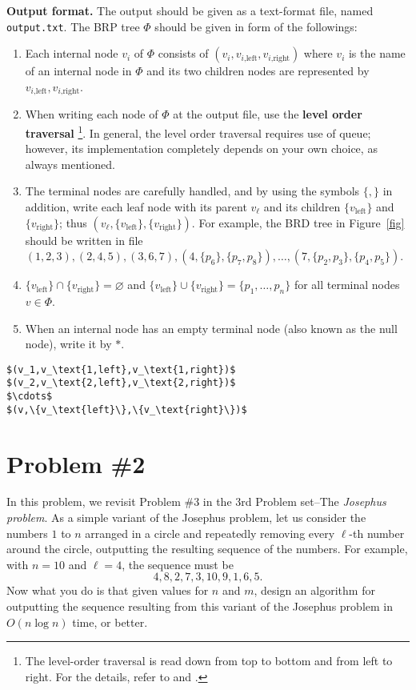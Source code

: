 \documentclass{article}
\begin{document}
\bigskip
\noindent\textbf{Output format.} %
The output should be given as a text-format file, named \texttt{output.txt}.
The BRP tree $\Phi$ should be given in form of the followings:
\begin{enumerate}
\item Each internal node $v_i$ of $\Phi$ consists of $(v_i,v_\text{$i$,left},v_\text{$i$,right})$ where $v_i$ is the name of an internal node in $\Phi$ and
its two children nodes are represented by $v_\text{$i$,left},v_\text{$i$,right}$.
\item When writing each node of $\Phi$ at the output file, use the \textbf{level order traversal}%
\footnote{The level-order traversal is read down from top to bottom and from left to right. 
For the details, refer to \cite[\S5.3.6]{HSAf08} and \cite[\S5.6]{Sed98}.
}. 
In general, the level order traversal requires use of queue;
	however, its implementation completely depends on your own choice, as always mentioned. 
\item The terminal nodes are carefully handled, and by using the symbols $\{,\}$ in addition, write each leaf node with its parent $v_\ell$ and 
	its children  $\{v_\text{left}\}$ and $\{v_\text{right}\}$; thus $(v_\ell,\{v_\text{left}\},\{v_\text{right}\})$.
	For example, the BRD tree in Figure~\ref{fig} should be written in file $(1,2,3),(2,4,5),(3,6,7),(4,\{p_6\},\{p_7,p_8\}),\ldots,(7,\{p_2,p_3\},\{p_4,p_5\})$.
\item  $\{v_\text{left}\}\cap\{v_\text{right}\}=\varnothing$ and  $\{v_\text{left}\}\cup\{v_\text{right}\}=\{p_1,\ldots,p_n\}$ for all terminal nodes $v\in\Phi$. 
\item When an internal node has an empty terminal node (also known as the null node), write it by $\ast$.
\end{enumerate}

\begin{lstlisting}[backgroundcolor=\color{yellow!40}]
$(v_1,v_\text{1,left},v_\text{1,right})$
$(v_2,v_\text{2,left},v_\text{2,right})$
$\cdots$
$(v,\{v_\text{left}\},\{v_\text{right}\})$
\end{lstlisting}


 
 
\newpage
\section*{Problem \#2}
In this problem, we revisit Problem \#3 in the 3rd Problem set--The \emph{Josephus problem}.
As a simple variant of  the Josephus problem, let us consider 
the numbers $1$ to $n$ arranged in a circle and repeatedly removing 
every $\ell$-th number around the circle, outputting the resulting sequence 
of the numbers.
For example, with $n=10$ and $\ell=4$, the sequence must be
\begin{equation*}
4,8,2,7,3,10,9,1,6,5.
\end{equation*}
Now what you do is that given values for $n$ and $m$, 
design an algorithm for outputting the sequence resulting from this variant of the Josephus problem 
in $O(n\log n)$ time, or better.
\end{document}
